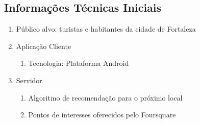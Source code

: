 \documentclass[10pt,a4paper,twocolumn]{article}
\begin{document}
\subsection*{Informações Técnicas Iniciais}
\begin{enumerate}
\item Público alvo: turistas e habitantes da cidade de Fortaleza
\item Aplicação Cliente
\begin{enumerate}
\item Tecnologia: Plataforma Android \cite{Android}
\end{enumerate}
\item Servidor
\begin{enumerate}
\item Algoritmo de recomendação para o próximo local
\item Pontos de interesses oferecidos pelo Foursquare \cite{Foursquare}
\end{enumerate}

\end{enumerate}






\end{document}
